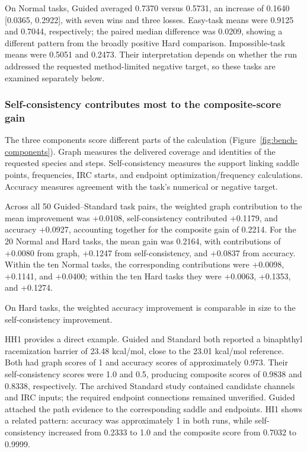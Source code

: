 On Normal tasks, Guided averaged 0.7370 versus 0.5731, an increase of 0.1640 [0.0365, 0.2922], with seven wins and three losses. Easy-task means were 0.9125 and 0.7044, respectively; the paired median difference was 0.0209, showing a different pattern from the broadly positive Hard comparison. Impossible-task means were 0.5051 and 0.2473. Their interpretation depends on whether the run addressed the requested method-limited negative target, so these tasks are examined separately below.

\subsubsection{Self-consistency contributes most to the composite-score gain}

The three components score different parts of the calculation (Figure~\ref{fig:bench-components}). Graph measures the delivered coverage and identities of the requested species and steps. Self-consistency measures the support linking saddle points, frequencies, IRC starts, and endpoint optimization/frequency calculations. Accuracy measures agreement with the task's numerical or negative target.

Across all 50 Guided--Standard task pairs, the weighted graph contribution to the mean improvement was +0.0108, self-consistency contributed +0.1179, and accuracy +0.0927, accounting together for the composite gain of 0.2214. For the 20 Normal and Hard tasks, the mean gain was 0.2164, with contributions of +0.0080 from graph, +0.1247 from self-consistency, and +0.0837 from accuracy. Within the ten Normal tasks, the corresponding contributions were +0.0098, +0.1141, and +0.0400; within the ten Hard tasks they were +0.0063, +0.1353, and +0.1274.

On Hard tasks, the weighted accuracy improvement is comparable in size to the self-consistency improvement.

HH1 provides a direct example. Guided and Standard both reported a binaphthyl racemization barrier of 23.48 kcal/mol, close to the 23.01 kcal/mol reference. Both had graph scores of 1 and accuracy scores of approximately 0.973. Their self-consistency scores were 1.0 and 0.5, producing composite scores of 0.9838 and 0.8338, respectively. The archived Standard study contained candidate channels and IRC inputs; the required endpoint connections remained unverified. Guided attached the path evidence to the corresponding saddle and endpoints. HI1 shows a related pattern: accuracy was approximately 1 in both runs, while self-consistency increased from 0.2333 to 1.0 and the composite score from 0.7032 to 0.9999.

